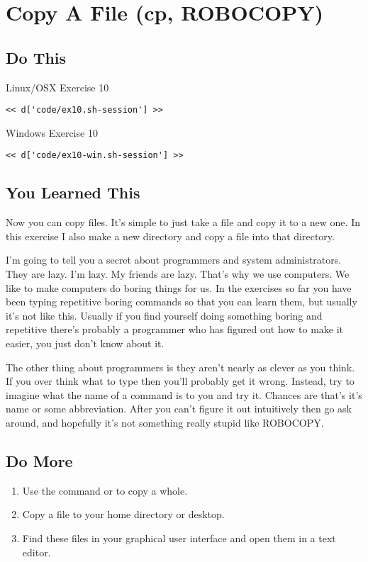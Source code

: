 \chapter{Copy A File (cp, ROBOCOPY)}

\section{Do This}

\begin{code}{Linux/OSX Exercise 10}
\begin{Verbatim}
<< d['code/ex10.sh-session'] >>
\end{Verbatim}
\end{code}

\begin{code}{Windows Exercise 10}
\begin{Verbatim}
<< d['code/ex10-win.sh-session'] >>
\end{Verbatim}
\end{code}

\section{You Learned This}

Now you can copy files.  It's simple to just take a file and copy it to a new
one.  In this exercise I also make a new directory and copy a file into that
directory.

I'm going to tell you a secret about programmers and system administrators.
They are lazy.  I'm lazy.  My friends are lazy.  That's why we use computers.
We like to make computers do boring things for us.  In the exercises so far
you have been typing repetitive boring commands so that you can learn them,
but usually it's not like this.  Usually if you find yourself doing something
boring and repetitive there's probably a programmer who has figured out
how to make it easier, you just don't know about it.

The other thing about programmers is they aren't nearly as clever as you
think.  If you over think what to type then you'll probably get it wrong.
Instead, try to imagine what the name of a command is to you and try it.
Chances are that's it's name or some abbreviation.  After you can't figure
it out intuitively then go ask around, and hopefully it's not something
really stupid like ROBOCOPY.


\section{Do More}

\begin{enumerate}
\item Use the  command or  to copy a
    whole.
\item Copy a file to your home directory or desktop.
\item Find these files in your graphical user interface and open them
    in a text editor.
\end{enumerate}

